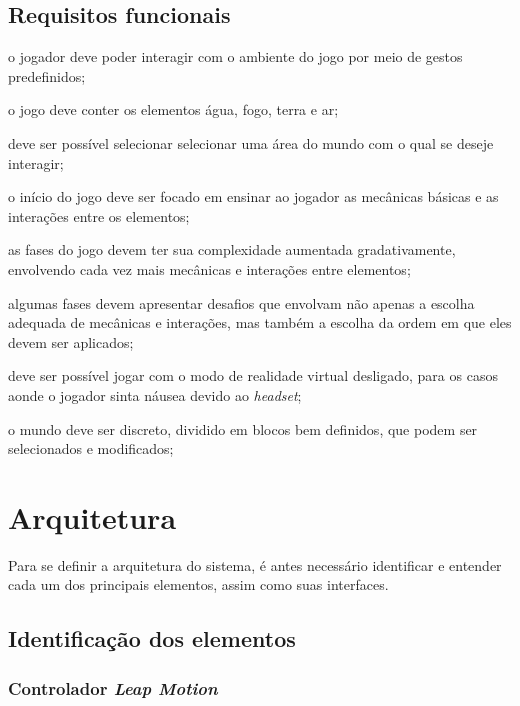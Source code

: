 \subsection{Requisitos funcionais}\label{subsec-requisitos-funcionais}

\begin{alineas}
	\item o jogador deve poder interagir com o ambiente do jogo 
	 por meio de gestos predefinidos;
	\item o jogo deve conter os elementos água, fogo,
	 terra e ar;
	\item deve ser possível selecionar selecionar
	 uma área do mundo com o qual se deseje interagir;
	\item o início do jogo deve ser focado em ensinar ao
	 jogador as mecânicas básicas e as interações entre os elementos;
	\item as fases do jogo devem ter sua complexidade aumentada
	 gradativamente, envolvendo cada vez mais mecânicas e
	 interações entre elementos;
	\item algumas fases devem apresentar desafios que envolvam
	 não apenas a escolha adequada de mecânicas e interações, 
	 mas também a escolha da ordem em que eles devem ser aplicados;
	
	\item deve ser possível jogar com o modo de realidade virtual
	 desligado, para os casos aonde o jogador sinta náusea 
	 devido ao \textit{headset}; 
	\item o mundo deve ser discreto, dividido em blocos bem
	 definidos, que podem ser selecionados e modificados;
	
	
\end{alineas}

\section{Arquitetura}\label{sec-desenvolvimento-arquitetura}

Para se definir a arquitetura do sistema, é antes necessário identificar e 
entender cada um dos principais elementos, assim como suas interfaces.

\subsection{Identificação dos elementos}\label{subsec-identificacao-elementos}

\subsubsection{Controlador \textit{Leap Motion}}\label{subsubsec-elemento-leapmotion}

